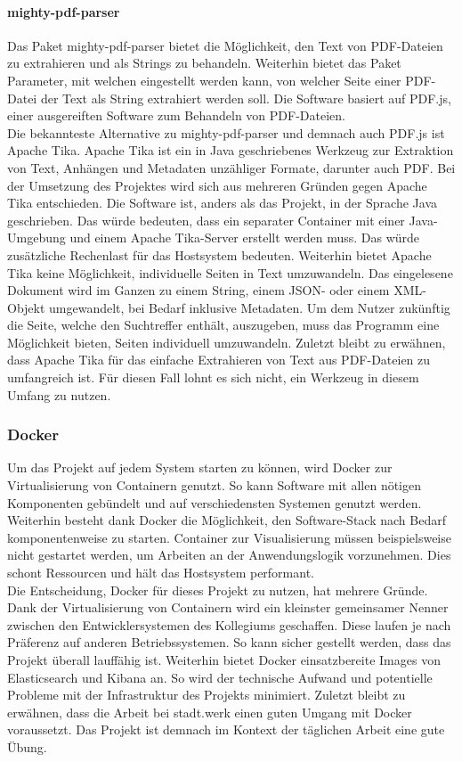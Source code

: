 \documentclass[a4paper]{scrartcl}
\begin{document}
\paragraph{mighty-pdf-parser}
Das Paket mighty-pdf-parser bietet die Möglichkeit, den Text von PDF-Dateien zu extrahieren und als Strings zu behandeln. Weiterhin bietet das Paket Parameter, mit welchen eingestellt werden kann, von welcher Seite einer PDF-Datei der Text als String extrahiert werden soll. Die Software basiert auf PDF.js, einer ausgereiften Software zum Behandeln von PDF-Dateien. \\
Die bekannteste Alternative zu mighty-pdf-parser und demnach auch PDF.js ist Apache Tika. Apache Tika ist ein in Java geschriebenes Werkzeug zur Extraktion von Text, Anhängen und Metadaten unzähliger Formate, darunter auch PDF. Bei der Umsetzung des Projektes wird sich aus mehreren Gründen gegen Apache Tika entschieden. Die Software ist, anders als das Projekt, in der Sprache Java geschrieben. Das würde bedeuten, dass ein separater Container mit einer Java-Umgebung und einem Apache Tika-Server erstellt werden muss. Das würde zusätzliche Rechenlast für das Hostsystem bedeuten. Weiterhin bietet Apache Tika keine Möglichkeit, individuelle Seiten in Text umzuwandeln. Das eingelesene Dokument wird im Ganzen zu einem String, einem JSON- oder einem XML-Objekt umgewandelt, bei Bedarf inklusive Metadaten. Um dem Nutzer zukünftig die Seite, welche den Suchtreffer enthält, auszugeben, muss das Programm eine Möglichkeit bieten, Seiten individuell umzuwandeln. Zuletzt bleibt zu erwähnen, dass Apache Tika für das einfache Extrahieren von Text aus PDF-Dateien zu umfangreich ist. Für diesen Fall lohnt es sich nicht, ein Werkzeug in diesem Umfang zu nutzen.

\subsubsection{Docker}
Um das Projekt auf jedem System starten zu können, wird Docker zur Virtualisierung von Containern genutzt. So kann Software mit allen nötigen Komponenten gebündelt und auf verschiedensten Systemen genutzt werden. Weiterhin besteht dank Docker die Möglichkeit, den Software-Stack nach Bedarf komponentenweise zu starten. Container zur Visualisierung müssen beispielsweise nicht gestartet werden, um Arbeiten an der Anwendungslogik vorzunehmen. Dies schont Ressourcen und hält das Hostsystem performant. \\
Die Entscheidung, Docker für dieses Projekt zu nutzen, hat mehrere Gründe. Dank der Virtualisierung von Containern wird ein kleinster gemeinsamer Nenner zwischen den Entwicklersystemen des Kollegiums geschaffen. Diese laufen je nach Präferenz auf anderen Betriebssystemen. So kann sicher gestellt werden, dass das Projekt überall lauffähig ist. Weiterhin bietet Docker einsatzbereite Images von Elasticsearch und Kibana an. So wird der technische Aufwand und potentielle Probleme mit der Infrastruktur des Projekts minimiert. Zuletzt bleibt zu erwähnen, dass die Arbeit bei stadt.werk einen guten Umgang mit Docker voraussetzt. Das Projekt ist demnach im Kontext der täglichen Arbeit eine gute Übung. \\
\end{document}
